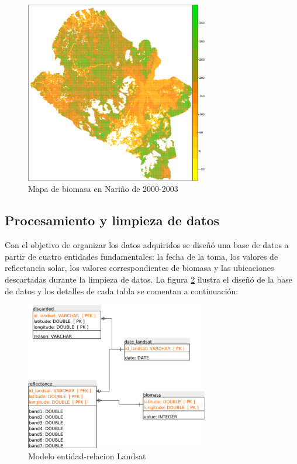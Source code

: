 \begin{figure}
  \centering
  \includegraphics[width = 8cm]{mapaNarino.pdf}
  \caption{Mapa de biomasa en Nariño de 2000-2003 \cite{baccini2008afirst}}
  \label{fig:mapaNarino}
\end{figure}

\subsection{Procesamiento y limpieza de datos}

Con el objetivo de organizar los datos adquiridos se diseñó una base de datos a partir de cuatro entidades fundamentales: la fecha de la toma, los valores de reflectancia solar, los valores correspondientes de biomasa y las ubicaciones descartadas durante la limpieza de datos.  La figura \ref{fig:landsatET} ilustra el diseñó de la base de datos y los detalles de cada tabla se comentan a continuación:

\begin{figure}
  \centering
  \includegraphics[width = 8cm]{landsatET.pdf}
  \caption{Modelo entidad-relacion Landsat}
  \label{fig:landsatET}
\end{figure}

